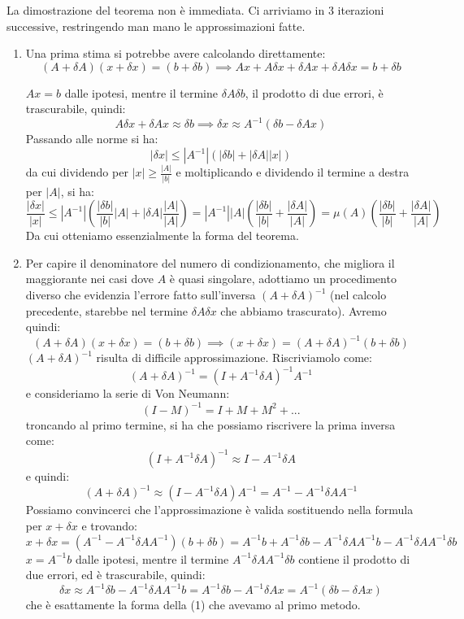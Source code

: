 \documentclass[a4paper,11pt]{article}
\begin{document}
La dimostrazione del teorema non è immediata.
Ci arriviamo in 3 iterazioni successive, restringendo man mano le approssimazioni fatte. 
\begin{enumerate}
	\item 
Una prima stima si potrebbe avere calcolando direttamente:
$$
(A + \delta A) (x + \delta x) = (b + \delta b) \implies Ax + A \delta x + \delta A x + \delta A \delta x = b + \delta b
$$

$Ax = b$ dalle ipotesi, mentre il termine $\delta A \delta b$, il prodotto di due errori, è trascurabile, quindi:
$$
A \delta x + \delta A x \approx \delta b \implies \delta x \approx A^{-1} \left( \delta b - \delta A x \right)
$$
Passando alle norme si ha:
\begin{equation}
| \delta x | \leq |A^{-1}| \left(|\delta b| + |\delta A| |x| \right)
\end{equation}
da cui dividendo per $|x| \geq \frac{|A|}{|b|}$ e moltiplicando e dividendo il termine a destra per $|A|$, si ha:
$$
\frac{|\delta x|}{|x|} \leq |A^{-1}| \left( \frac{|\delta b|}{|b|} |A| + |\delta A| \frac{|A|}{|A|} \right) = |A^{-1}| |A| \left( \frac{|\delta b|}{|b|} + \frac{|\delta A|}{|A|} \right) = \mu(A) \left( \frac{|\delta b|}{|b|} + \frac{|\delta A|}{|A|} \right)
$$
Da cui otteniamo essenzialmente la forma del teorema. 

\item
Per capire il denominatore del numero di condizionamento, che migliora il maggiorante nei casi dove $A$ è quasi singolare, adottiamo un procedimento diverso che evidenzia l'errore fatto sull'inversa $(A + \delta A)^{-1}$ (nel calcolo precedente, starebbe nel termine $\delta A \delta x$ che abbiamo trascurato).
Avremo quindi:
$$
(A + \delta A) (x + \delta x) = (b + \delta b) \implies (x + \delta x) = (A + \delta A)^{-1} (b + \delta b)
$$
$(A + \delta A)^{-1}$ risulta di difficile approssimazione.
Riscriviamolo come:
$$
(A + \delta A)^{-1} = (I + A^{-1} \delta A)^{-1} A^{-1}
$$
e consideriamo la serie di Von Neumann:
$$
(I - M)^{-1} = I + M + M^2 + ...
$$
troncando al primo termine, si ha che possiamo riscrivere la prima inversa come:
$$
(I + A^{-1} \delta A)^{-1} \approx I - A^{-1} \delta A 
$$
e quindi:
\begin{equation}
(A + \delta A)^{-1} \approx (I - A^{-1} \delta A ) A^{-1} = A^{-1} - A^{-1} \delta A A^{-1} 
\end{equation}
Possiamo convincerci che l'approssimazione è valida sostituendo nella formula per $x + \delta x$ e trovando:
$$
x + \delta x = (A^{-1} - A^{-1} \delta A A^{-1}) (b + \delta b) = A^{-1} b + A^{-1} \delta b - A^{-1} \delta A A^{-1} b - A^{-1} \delta A A^{-1} \delta b
$$
$x = A^{-1} b$ dalle ipotesi, mentre il termine $A^{-1} \delta A A^{-1} \delta b$ contiene il prodotto di due errori, ed è trascurabile, quindi:
$$
\delta x \approx A^{-1} \delta b - A^{-1} \delta A A^{-1} b = A^{-1} \delta b - A^{-1} \delta A x = A^{-1} \left( \delta b - \delta A x \right)
$$
che è esattamente la forma della (1) che avevamo al primo metodo.


\end{enumerate}
\end{document}
